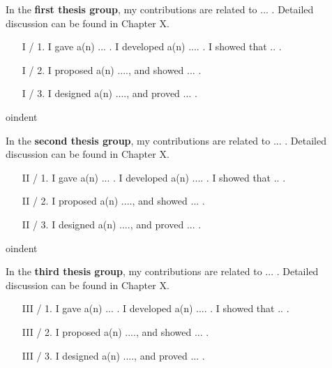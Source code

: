 \documentclass[12pt,a4paper]{extarticle}
\begin{document}
\vspace*{1em}

In the \textbf {first thesis group}, my contributions are related to ... . Detailed discussion can be found in Chapter X.
\vspace*{1em}
\begin{enumerate}[wide = 0pt, widest = {I/4.}, leftmargin =*]
    \item [I / 1.] I gave a(n) ... . I developed a(n) .... . 
    I showed that .. .
    
    \item [I / 2.] I proposed a(n) ...., and showed ... .
    
    \item [I / 3.] I designed a(n) ...., and proved ... .

\end{enumerate}

\vspace*{1em}

oindent

In the \textbf {second thesis group}, my contributions are related to ... . Detailed discussion can be found in Chapter X.
\vspace*{1em}
\begin{enumerate}[wide = 0pt, widest = {II/5.}, leftmargin =*]
    \item [II / 1.] I gave a(n) ... . I developed a(n) .... . 
    I showed that .. .
    
    \item [II / 2.] I proposed a(n) ...., and showed ... .
    
    \item [II / 3.] I designed a(n) ...., and proved ... .
\end{enumerate}

\vspace*{1em}

oindent

In the \textbf {third thesis group}, my contributions are related to ... . Detailed discussion can be found in Chapter X.

\begin{enumerate}[wide = 0pt, widest = {III/5.}, leftmargin =*]
    \item [III / 1.] I gave a(n) ... . I developed a(n) .... . 
    I showed that .. .
    
    \item [III / 2.] I proposed a(n) ...., and showed ... .
    
    \item [III / 3.] I designed a(n) ...., and proved ... .
\end{enumerate}
\end{document}
